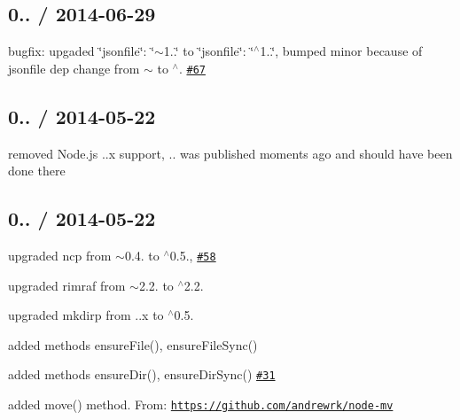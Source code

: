 \subsection*{0.. / 2014-\/06-\/29 }


\begin{DoxyItemize}
\item bugfix\+: upgaded {\ttfamily \char`\"{}jsonfile\char`\"{}\+: \char`\"{}$\sim$1..\char`\"{}} to {\ttfamily \char`\"{}jsonfile\char`\"{}\+: \char`\"{}$^\wedge$1..\char`\"{}}, bumped minor because of {\ttfamily jsonfile} dep change from {\ttfamily $\sim$} to {\ttfamily $^\wedge$}. \href{https://github.com/jprichardson/node-fs-extra/issues/67}{\tt \#67}
\end{DoxyItemize}

\subsection*{0.. / 2014-\/05-\/22 }


\begin{DoxyItemize}
\item removed Node.\+js {..\+x} support, {..} was published moments ago and should have been done there
\end{DoxyItemize}

\subsection*{0.. / 2014-\/05-\/22 }


\begin{DoxyItemize}
\item upgraded {\ttfamily ncp} from {\ttfamily $\sim$0.4.} to {\ttfamily $^\wedge$0.5.}, \href{https://github.com/jprichardson/node-fs-extra/issues/58}{\tt \#58}
\item upgraded {\ttfamily rimraf} from {\ttfamily $\sim$2.2.} to {\ttfamily $^\wedge$2.2.}
\item upgraded {\ttfamily mkdirp} from {..\+x} to {\ttfamily $^\wedge$0.5.}
\item added methods {\ttfamily ensure\+File()}, {\ttfamily ensure\+File\+Sync()}
\item added methods {\ttfamily ensure\+Dir()}, {\ttfamily ensure\+Dir\+Sync()} \href{https://github.com/jprichardson/node-fs-extra/issues/31}{\tt \#31}
\item added {\ttfamily move()} method. From\+: \href{https://github.com/andrewrk/node-mv}{\tt https\+://github.\+com/andrewrk/node-\/mv}
\end{DoxyItemize}

